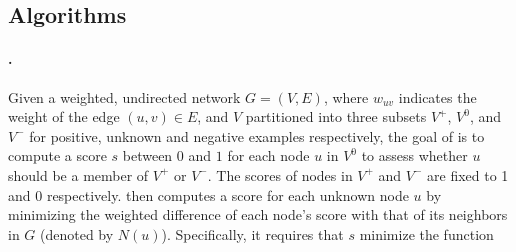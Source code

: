 
\subsection{Algorithms}
\label{sec:algorithms}


\paragraph{\sinksource.} 
Given a weighted, undirected network $G = (V, E)$, %
where $w_{uv}$ indicates the weight of the edge $(u,v)\in E$,
and $V$ partitioned into three subsets $V^+$, $V^0$, and $V^-$ for positive, unknown and negative examples respectively, the goal of \sinksource is to compute a score $s$ between $0$ and $1$ for each node $u$ in $V^0$ to assess whether $u$ should be a member of $V^+$ or $V^-$. 
The scores of nodes in $V^+$ and $V^-$ are fixed to 1 and 0 respectively.
\sinksource then computes a score for each unknown node $u$ by minimizing the weighted difference of each node's score with that of its neighbors in $G$ (denoted by $N(u)$). Specifically, it requires that $s$ minimize the function

